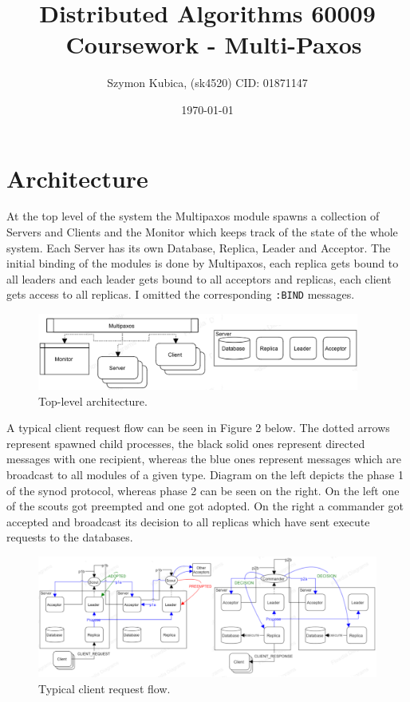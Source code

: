 \documentclass[11pt]{article}
\begin{document}
\title{Distributed Algorithms 60009 \ Coursework - Multi-Paxos}
\date{\today}
\author{Szymon Kubica, (sk4520) CID: 01871147}
 {\let\newpage\relax\maketitle}

\section*{Architecture}
At the top level of the system the Multipaxos module spawns a collection of
Servers and Clients and the Monitor which keeps track of the state of the whole
system. Each Server has its own Database, Replica, Leader and Acceptor. The
initial binding of the modules is done by Multipaxos, each replica gets bound
to all leaders and each leader gets bound to all acceptors and replicas,
each client gets access to all replicas. I omitted the corresponding \texttt{:BIND}
messages.
\begin{figure}[H]
    \centering
    \includegraphics[width=400px]{architecture0.png}
    \caption{Top-level architecture.}
    \vspace{-15pt}
\end{figure}
A typical client request flow can be seen in Figure 2 below. The dotted arrows
represent spawned child processes, the black solid ones represent directed messages
with one recipient, whereas the blue ones represent messages which are broadcast
to all modules of a given type. Diagram on the left depicts the phase 1 of the synod protocol,
whereas phase 2 can be seen on the right. On the left one of the scouts
got preempted and one got adopted. On the right a commander got accepted
and broadcast its decision to all replicas which have
sent execute requests to the databases.
    \vspace{-5pt}
\begin{figure}[H]
    \centering
    \includegraphics[width=\textwidth]{architecture1.png}
    \caption{Typical client request flow.}
\end{figure}
\end{document}
